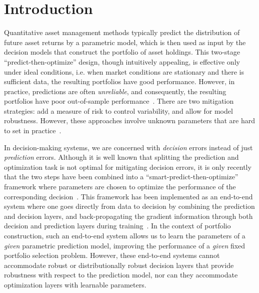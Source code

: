 \documentclass[10pt, twocolumn]{article}
\theoremstyle{plain}
\theoremstyle{definition}
\begin{document}
\section{Introduction}\label{sec:intro}

Quantitative asset management methods typically predict the 
distribution of future asset returns by a parametric model, which is then 
used as input by the decision models that construct the portfolio of asset holdings. 
This two-stage ``predict-then-optimize'' design, though intuitively appealing, is
effective only under ideal conditions, i.e. when market conditions are stationary 
and there is sufficient data, the resulting portfolios have good performance. However, 
in practice, predictions are often \emph{unreliable}, and consequently, 
the resulting portfolios have poor out-of-sample performance~\citep{chopra1993, 
merton1980estimating, best1991sensitivity, broadie1993computing}. There are two 
mitigation strategies: add a measure of risk to control variability, and allow for 
model robustness. However, these approaches involve unknown parameters 
that are hard to set in practice~\citep{bertsimas2018data}. 

In decision-making systems, we are concerned with
\emph{decision} errors instead of just \emph{prediction} errors. Although
it is well known that splitting the prediction and optimization task is
not optimal for mitigating decision errors, it is only recently that the
two steps have been combined into a ``smart-predict-then-optimize''
framework where parameters are chosen to optimize the performance 
of the corresponding decision~\citep{elmachtoub2020decision}. 
This framework has been implemented as an end-to-end system where one 
goes directly from data to decision by combining the prediction and 
decision layers, and back-propagating the gradient information 
through both decision and prediction layers during 
training~\citep{donti2017task}. In the context of portfolio construction,
such an end-to-end system allows us to learn the parameters of a
\emph{given} parametric prediction model, improving the
performance of a \emph{given} fixed portfolio selection problem. 
However, these end-to-end systems cannot accommodate robust or 
distributionally robust decision layers that provide robustness with 
respect to the prediction model, nor can they accommodate optimization 
layers with learnable parameters.  
\end{document}
